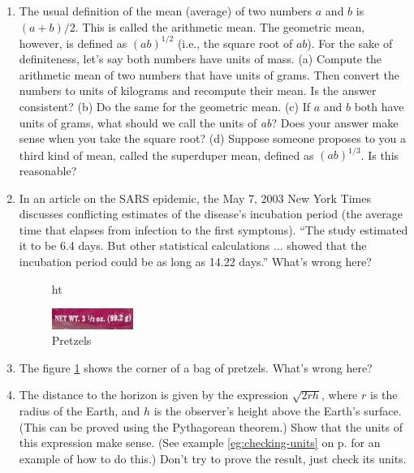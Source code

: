 \begin{enumerate}
\item The usual definition of the mean (average) of two
numbers $a$ and $b$ is $(a+b)/2$. This is called the
arithmetic mean. The geometric mean, however, is defined as
$(ab)^{1/2}$ (i.e., the square root of $ab$). For the sake of definiteness, let's say both
numbers have units of mass. (a) Compute the arithmetic mean
of two numbers that have units of grams. Then convert the
numbers to units of kilograms and recompute their mean. Is
the answer consistent? (b) Do the same for the geometric
mean. (c) If $a$ and $b$ both have units of grams, what
should we call the units of \emph{ab}? Does your answer make
sense when you take the square root? (d) Suppose someone
proposes to you a third kind of mean, called the superduper
mean, defined as $(ab)^{1/3}$. Is this reasonable?

\item 
 In an article on the SARS epidemic, the May 7, 2003 New
York Times discusses conflicting estimates of the disease's
incubation period (the average time that elapses from
infection to the first symptoms). ``The study estimated it
to be 6.4 days. But other statistical calculations ...
showed that the incubation period could be as long as 14.22
days.'' What's wrong here?


\begin{figure}{ht}
\begin{center}
\includegraphics[width=0.25\textwidth]{./introduction/figs/pretzels}
\caption{ Pretzels}
\label{pretzel}
\end{center}
\end{figure}

\vspace{1.5mm}

\item 
 The figure \ref{pretzel} shows the corner of a bag of pretzels. What's wrong here?


\item 
The distance to the horizon is given by the expression $\sqrt{2rh}$, where $r$ is the
radius of the Earth, and $h$ is the observer's height above the Earth's surface. (This can
be proved using the Pythagorean theorem.) Show that the units of this expression make
sense. (See example \ref{eg:checking-units} on p.
\pageref{eg:checking-units} for an example of how to do this.)
Don't try to prove the result, just check its units.

\end{enumerate}





